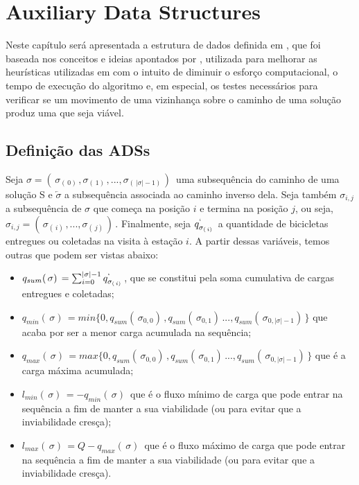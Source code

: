 \chapter{Auxiliary Data Structures}\label{chp:LABEL_CHP_4}
\par Neste capítulo será apresentada a estrutura de dados definida em \citep{art:REF_ART_4}, que foi baseada nos conceitos e ideias apontados por \citep{art:REF_ART_3}, utilizada para melhorar as heurísticas utilizadas em \citep{art:REF_ART_1} com o intuito de diminuir o esforço computacional, o tempo de execução do algoritmo e, em especial, os testes necessários para verificar se um movimento de uma vizinhança sobre o caminho de uma solução produz uma que seja viável.

\section{Definição das ADSs}\label{sec:LABEL_CHP_4_SEC_A}
\par Seja $\sigma = (\, \sigma_{(\,0)\,}, \sigma_{(\,1)\,}, ..., \sigma_{(\,|\sigma| - 1)\,})\,$ uma subsequência do caminho de uma solução S e $\overleftarrow{\sigma}$ a subsequência associada ao caminho inverso dela. Seja também $\sigma_{i, j}$ a subsequência de $\sigma$ que começa na posição $i$ e termina na posição $j$, ou seja, $\sigma_{i, j} = (\, \sigma_{(\,i)\,}, ..., \sigma_{(\,j)\,})\,$. Finalmente, seja $q^{\lq}_{\sigma_{(\,i)\,}}$ a quantidade de bicicletas entregues ou coletadas na visita à estação $i$. A partir dessas variáveis, temos outras que podem ser vistas abaixo:

    \begin{itemize}
        \item $q_{sum}(\,\sigma)\, = \sum^{|\sigma|-1}_{i=0}q^{\lq}_{\sigma_{(\,i)\,}}$, que se constitui pela soma cumulativa de cargas entregues e coletadas;
        \item $q_{min}(\,\sigma)\, = min\{0, q_{sum}(\,\sigma_{0, 0})\,, q_{sum}(\,\sigma_{0, 1})\, ..., q_{sum}(\,\sigma_{0, |\sigma|-1})\,\}$ que acaba por ser a menor carga acumulada na sequência;
        \item $q_{max}(\,\sigma)\, = max\{0, q_{sum}(\,\sigma_{0, 0})\,, q_{sum}(\,\sigma_{0, 1})\, ..., q_{sum}(\,\sigma_{0, |\sigma|-1})\,\}$ que é a carga máxima acumulada;
        \item $l_{min}(\,\sigma)\, = -q_{min}(\,\sigma)\,$ que é o fluxo mínimo de carga que pode entrar na sequência a fim de manter a sua viabilidade (ou para evitar que a inviabilidade cresça);
        \item $l_{max}(\,\sigma)\, = Q -q_{max}(\,\sigma)\,$ que é o fluxo máximo de carga que pode entrar na sequência a fim de manter a sua viabilidade (ou para evitar que a inviabilidade cresça).
    \end{itemize}
    
